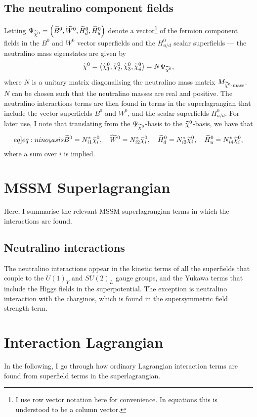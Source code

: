 \documentclass[english, notitlepage]{article}
\begin{document}
\subsection{The neutralino component fields}
Letting $\Psi_{\nino} = \pclosed{\bino, \wino, \hinod, \hinou}$ denote a
vector\footnote{I use row vector notation here for convenience. In equations
    this is understood to be a column vector.} of the fermion component fields in
the $B^0$ and $W^0$ vector superfields and the $H^0_{u/d}$ scalar superfields
--- the neutralino mass eigenstates are given by
\begin{align}
    \nino = \pclosed{\nino[1], \nino[2], \nino[3], \nino[4]} = N \Psi_{\nino},
\end{align}
where $N$ is a unitary matrix diagonalising the neutralino mass matrix $M_{\nino\text{-mass}}$.
\(N\) can be chosen such that the neutralino masses are real and positive.
The neutralino interactions terms are then found in terms in the superlagrangian that include the vector superfields $B^0$ and $W^0$, and the scalar superfields $H^0_{u/d}$.
For later use, I note that translating from the $\Psi_{\nino}$-basis to the $\nino$-basis, we have that
\begin{align}
    \label[eq]{eq:nino_basis}
    \bino = N_{i1}^\ast \nino[i],\quad \wino = N_{i2}^\ast \nino[i],\quad \hinod = N_{i3}^\ast \nino[i],\quad \hinou = N_{i4}^\ast \nino[i],
\end{align}
where a sum over $i$ is implied.

\section{MSSM Superlagrangian}
Here, I summarise the relevant MSSM superlagrangian terms in which the
interactions are found.
\subsection{Neutralino interactions}
The neutralino interactions appear in the kinetic terms of all the superfields
that couple to the $U(1)_Y$ and $SU(2)_L$ gauge groups, and the Yukawa terms
that include the Higgs fields in the superpotential. The exception is
neutralino interaction with the charginos, which is found in the supersymmetric
field strength term.

\section{Interaction Lagrangian}
In the following, I go through how ordinary Lagrangian interaction terms are
found from superfield terms in the superlagrangian.
\end{document}
